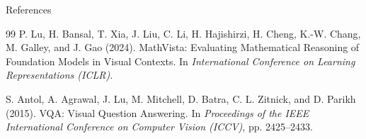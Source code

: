 \documentclass[aspectratio=169]{beamer}
\begin{document}
\begin{frame}[allowframebreaks]{References}
\begin{thebibliography}{99}
			 P. Lu, H. Bansal, T. Xia, J. Liu, C. Li, H. Hajishirzi, H. Cheng, K.-W. Chang, M. Galley, and J. Gao (2024). MathVista: Evaluating Mathematical Reasoning of Foundation Models in Visual Contexts. In \textit{International Conference on Learning Representations (ICLR)}.
			
			 S. Antol, A. Agrawal, J. Lu, M. Mitchell, D. Batra, C. L. Zitnick, and D. Parikh (2015). VQA: Visual Question Answering. In \textit{Proceedings of the IEEE International Conference on Computer Vision (ICCV)}, pp. 2425--2433.
			
		\end{thebibliography}
	\end{frame}
	
\end{document}
